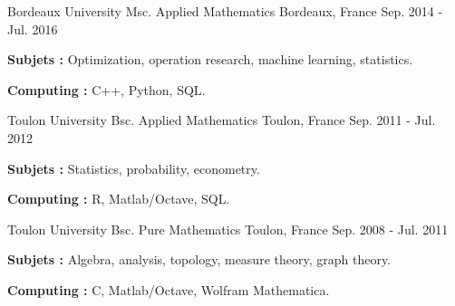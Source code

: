 

\begin{cventries}

\cventry
    {Bordeaux University} %
    {Msc. Applied Mathematics} %
    {Bordeaux, France} %
    {Sep. 2014 - Jul. 2016} %
    {
    \begin{cvitems} %
        \item {\textbf{Subjets :} Optimization, operation research, machine learning, statistics.}
        \item {\textbf{{Computing} :} C++, Python, SQL.}
    \end{cvitems}
    }


\cventry
    {Toulon University} %
    {Bsc. Applied Mathematics} %
    {Toulon, France} %
    {Sep. 2011 - Jul. 2012} %
    {
    \begin{cvitems} %
        \item {\textbf{Subjets :} Statistics, probability, econometry.}
        \item {\textbf{Computing :} R, Matlab/Octave, SQL.}
    \end{cvitems}
    }


\cventry
    {Toulon University} %
    {Bsc. Pure Mathematics} %
    {Toulon, France} %
    {Sep. 2008 - Jul. 2011} %
    {
    \begin{cvitems} %
        \item {\textbf{Subjets :} Algebra, analysis, topology, measure theory, graph theory.}
        \item {\textbf{Computing :} C, Matlab/Octave, Wolfram Mathematica.}
    \end{cvitems}
    }



\end{cventries}
